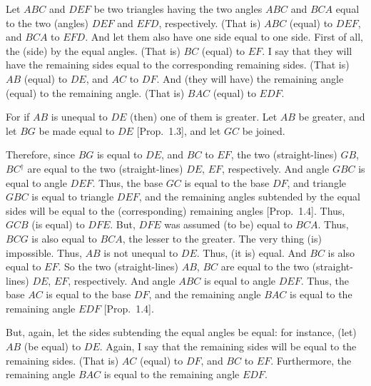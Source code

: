 \begin{Parallel}{}{}
{Let $ABC$ and $DEF$ be two triangles having the two angles $ABC$ and
$BCA$ equal to the two (angles) $DEF$ and $EFD$, respectively.
(That is) $ABC$ (equal) to $DEF$, and $BCA$ to $EFD$. And let them also have
one side equal to one side. First of all, the (side) by the equal angles. (That is)
$BC$ (equal) to $EF$. I say that they will have the  remaining sides equal to the
corresponding remaining sides. (That is) $AB$ (equal) to $DE$, and $AC$ to
$DF$. And (they will have) the remaining angle (equal) to the remaining angle.
(That is) $BAC$ (equal) to $EDF$.

For if $AB$ is unequal to $DE$ (then) one of them is greater. Let $AB$ be greater,
and let $BG$ be made equal to $DE$ [Prop.~1.3], and let $GC$ be
joined.

Therefore, since $BG$ is equal to $DE$, and $BC$ to $EF$, the two (straight-lines)
$GB$, $BC$$^\dag$ are equal to the two (straight-lines) $DE$, $EF$, respectively. And angle
$GBC$ is equal to angle $DEF$. Thus, the base $GC$ is equal to the base $DF$,
and triangle $GBC$ is equal to triangle $DEF$, and the remaining angles 
subtended by the equal sides will
be equal to the (corresponding) remaining angles [Prop.~1.4].
Thus, $GCB$ (is equal) to $DFE$. But,  $DFE$ was assumed (to be) equal to $BCA$.
Thus, $BCG$ is also equal to $BCA$, the lesser to the greater. The very thing (is) impossible. Thus, $AB$ is not unequal to $DE$. Thus, (it is) equal. And $BC$ is
also equal to $EF$. So the two (straight-lines) $AB$, $BC$ are equal to the two (straight-lines) $DE$, $EF$, respectively. And angle $ABC$ is equal to
angle $DEF$. Thus, the base $AC$ is equal to the base $DF$, and the remaining
angle $BAC$ is equal to the remaining angle $EDF$ [Prop.~1.4].

\epsfysize=1.5in
\centerline{}

But, again, let the sides subtending the equal angles be equal: for instance, 
(let) $AB$ (be equal) to
$DE$.  Again, I say that the remaining sides will be equal to the remaining
sides. (That is) $AC$ (equal) to $DF$, and $BC$ to $EF$. Furthermore, the remaining angle
$BAC$ is equal to the remaining angle $EDF$.

}
\end{Parallel}
